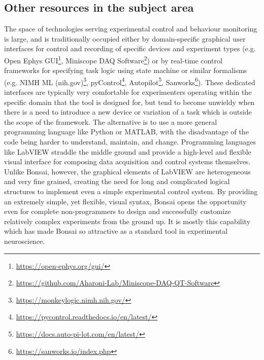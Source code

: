 \subsection*{Other resources in the subject area}

The space of technologies serving experimental control and behaviour monitoring
is large, and is traditionally occupied either by domain-specific graphical
user interfaces for control and recording of specific devices and experiment
types (e.g. Open Ephys
GUI\footnote{\href{https://open-ephys.org/gui/}{https://open-ephys.org/gui/}},
Miniscope DAQ
Software\footnote{\href{https://github.com/Aharoni-Lab/Miniscope-DAQ-QT-Software}{https://github.com/Aharoni-Lab/Miniscope-DAQ-QT-Software}})
or by real-time control frameworks for specifying task logic using state
machine or similar formalisms (e.g. NIMH ML
(nih.gov)\footnote{\href{https://monkeylogic.nimh.nih.gov/}{https://monkeylogic.nimh.nih.gov/}},
pyControl\footnote{\href{https://pycontrol.readthedocs.io/en/latest/}{https://pycontrol.readthedocs.io/en/latest/}},
Autopilot\footnote{\href{https://docs.auto-pi-lot.com/en/latest/}{https://docs.auto-pi-lot.com/en/latest/}},
Sanworks\footnote{\href{https://sanworks.io/index.php}{https://sanworks.io/index.php}}).
These dedicated interfaces are typically very comfortable for experimenters
operating within the specific domain that the tool is designed for, but tend to
become unwieldy when there is a need to introduce a new device or variation of
a task which is outside the scope of the framework. The alternative is to use a
more general programming language like Python or MATLAB, with the disadvantage
of the code being harder to understand, maintain, and change. Programming
languages like LabVIEW straddle the middle ground and provide a high-level and
flexible visual interface for composing data acquisition and control systems
themselves. Unlike Bonsai, however, the graphical elements of LabVIEW are
heterogeneous and very fine grained, creating the need for long and complicated
logical structures to implement even a simple experimental control system. By
providing an extremely simple, yet flexible, visual syntax, Bonsai opens the
opportunity even for complete non-programmers to design and successfully
customize relatively complex experiments from the ground up. It is mostly this
capability which has made Bonsai so attractive as a standard tool in
experimental neuroscience.

